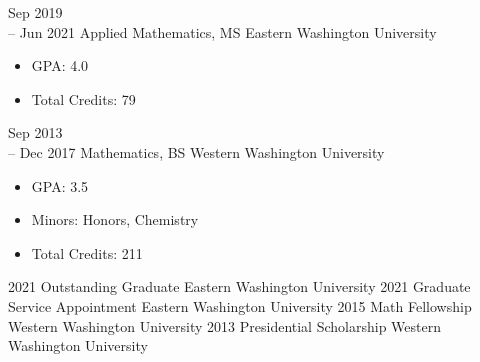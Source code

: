 \documentclass[11pt]{developercv} %
\newcommand{\vsp}{\vspace{-10pt}}
\begin{document}
\begin{entrylist}
	\entry
		{Sep 2019\\
		-- Jun 2021}
		{Applied Mathematics, MS}
		{Eastern Washington University}
		{\vspace{-0.5cm}\begin{itemize}
			\item GPA: 4.0
			\item Total Credits: 79
		\end{itemize}}
	\entry
		{Sep 2013\\
		-- Dec 2017}
		{Mathematics, BS}
		{Western Washington University}
		{\vspace{-0.5cm}\begin{itemize}
			\item GPA: 3.5
			\item Minors: Honors, Chemistry
			\item Total Credits: 211
		\end{itemize}}
\end{entrylist}
\vsp

\begin{entrylist}
	\vspace{-0.5cm}
	\entry
		{2021}
		{Outstanding Graduate}
		{Eastern Washington University}
		{}
	\vspace{-0.5cm}
	\entry
		{2021}
		{Graduate Service Appointment}
		{Eastern Washington University}
		{}
	\vspace{-0.5cm}
	\entry
		{2015}
		{Math Fellowship}
		{Western Washington University}
		{}
	\entry
		{2013}
		{Presidential Scholarship}
		{Western Washington University}
		{}
\end{entrylist}
\vsp
\end{document}
